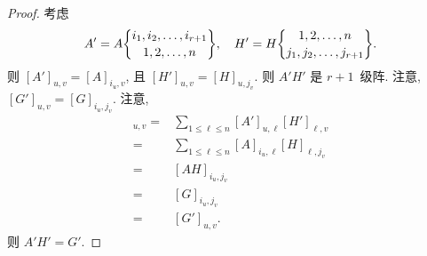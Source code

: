 \documentclass[../libro.tex]{subfiles}
\begin{document}
\begin{proof}
    考虑
    \begin{align*}
        A' = A\submat{i_1,i_2,\dots,i_{r+1}}{1,2,\dots,n},
        \quad
        H' = H\submat{1,2,\dots,n}{j_1,j_2,\dots,j_{r+1}}.
    \end{align*}
    则 \([A']_{u,v} = [A]_{i_u,v}\),
    且 \([H']_{u,v} = [H]_{u,j_v}\).
    则 \(A' H'\) 是 \(r + 1\)~级阵.
    注意, \([G']_{u,v} = [G]_{i_u,j_v}\).
    注意,
    \begin{align*}
        [A' H']_{u,v}
        = {} &
        \sum_{1 \leq \ell \leq n}
        {[A']_{u,\ell} [H']_{\ell,v}}
        \\
        = {} &
        \sum_{1 \leq \ell \leq n}
        {[A]_{i_u,\ell} [H]_{\ell,j_v}}
        \\
        = {} &
        [A H]_{i_u,j_v}
        \\
        = {} &
        [G]_{i_u,j_v}
        \\
        = {} &
        [G']_{u,v}.
    \end{align*}
    则 \(A' H' = G'\).


\end{proof}
\end{document}
